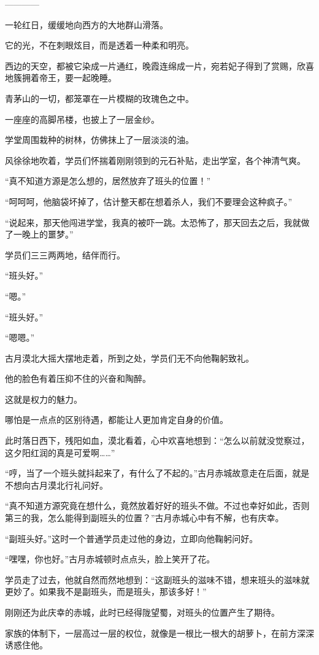 \begin{this_body}
------------

一轮红日，缓缓地向西方的大地群山滑落。

它的光，不在刺眼炫目，而是透着一种柔和明亮。

西边的天空，都被它染成一片通红，晚霞连绵成一片，宛若妃子得到了赏赐，欣喜地簇拥着帝王，要一起晚睡。

青茅山的一切，都笼罩在一片模糊的玫瑰色之中。

一座座的高脚吊楼，也披上了一层金纱。

学堂周围栽种的树林，仿佛抹上了一层淡淡的油。

风徐徐地吹着，学员们怀揣着刚刚领到的元石补贴，走出学室，各个神清气爽。

“真不知道方源是怎么想的，居然放弃了班头的位置！”

“呵呵呵，他脑袋坏掉了，估计整天都在想着杀人，我们不要理会这种疯子。”

“说起来，那天他闯进学堂，我真的被吓一跳。太恐怖了，那天回去之后，我就做了一晚上的噩梦。”

学员们三三两两地，结伴而行。

“班头好。”

“嗯。”

“班头好。”

“嗯嗯。”

古月漠北大摇大摆地走着，所到之处，学员们无不向他鞠躬致礼。

他的脸色有着压抑不住的兴奋和陶醉。

这就是权力的魅力。

哪怕是一点点的区别待遇，都能让人更加肯定自身的价值。

此时落日西下，残阳如血，漠北看着，心中欢喜地想到：“怎么以前就没觉察过，这夕阳红润的真是可爱啊……”

“哼，当了一个班头就抖起来了，有什么了不起的。”古月赤城故意走在后面，就是不想向古月漠北行礼问好。

“真不知道方源究竟在想什么，竟然放着好好的班头不做。不过也幸好如此，否则第三的我，怎么能得到副班头的位置？”古月赤城心中有不解，也有庆幸。

“副班头好。”这时一个普通学员走过他的身边，立即向他鞠躬问好。

“嘿嘿，你也好。”古月赤城顿时点点头，脸上笑开了花。

学员走了过去，他就自然而然地想到：“这副班头的滋味不错，想来班头的滋味就更妙了。如果我不是副班头，而是班头，那该多好！”

刚刚还为此庆幸的赤城，此时已经得陇望蜀，对班头的位置产生了期待。

家族的体制下，一层高过一层的权位，就像是一根比一根大的胡萝卜，在前方深深诱惑住他。


\end{this_body}
